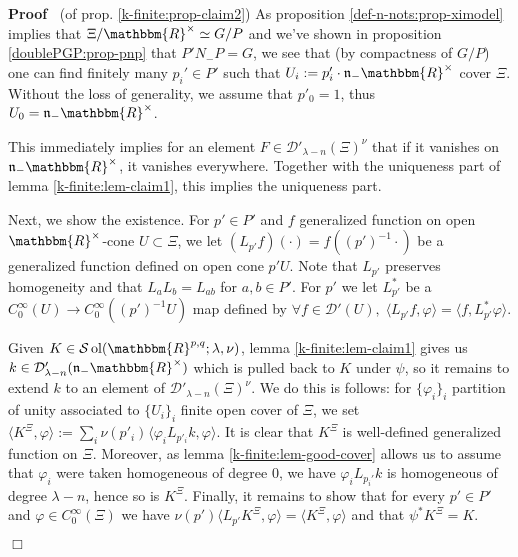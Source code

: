\documentclass{article}
\newcommand{\assign}{:=}
\newcommand{\tmop}[1]{\ensuremath{\operatorname{#1}}}
\newenvironment{proof}{\noindent\textbf{Proof\ }}{\hspace*{\fill}$\Box$\medskip}
\begin{document}
\begin{proof}
  (of prop. \ref{k-finite:prop-claim2}) As proposition
  \ref{def-n-nots:prop-ximodel} implies that $\Xi /\mathbbm{R}^{\times} \simeq
  G / P$ and we've shown in proposition \ref{doublePGP:prop-pnp} that $P' N_-
  P = G$, we see that (by compactness of $G / P$) one can find finitely many
  $p_i' \in P'$ such that $U_i \assign p_i' \cdot \mathfrak{n}_-
  \mathbbm{R}^{\times}$ cover $\Xi$. Without the loss of generality, we assume
  that $p'_0 = 1$, thus $U_0 =\mathfrak{n}_- \mathbbm{R}^{\times}$.
  
  This immediately implies for an element $F \in \mathcal{D}'_{\lambda - n}
  (\Xi)^{\nu}$ that if it vanishes on $\mathfrak{n}_- \mathbbm{R}^{\times}$,
  it vanishes everywhere. Together with the uniqueness part of lemma
  \ref{k-finite:lem-claim1}, this implies the uniqueness part.
  
  Next, we show the existence. For $p' \in P'$ and $f$ generalized function on
  open $\mathbbm{R}^{\times}$-cone $U \subset \Xi$, we let $(L_{p'} f) (\cdot)
  = f ((p')^{- 1} \cdot)$ be a generalized function defined on open cone $p'
  U$. Note that $L_{p'}$ preserves homogeneity and that $L_a L_b = L_{a b}$
  for $a, b \in P'$. For $p'$ we let $L_{p'}^{\ast}$ be a $C_0^{\infty} (U)
  \rightarrow C_0^{\infty} ((p')^{- 1} U)$ map defined by $\forall f \in
  \mathcal{D}' (U), \; \langle L_{p'} f, \varphi \rangle = \langle f,
  L_{p'}^{\ast} \varphi \rangle$.
  
  Given $K \in \mathcal{S} \tmop{ol} (\mathbbm{R}^{p, q} ; \lambda, \nu)$,
  lemma \ref{k-finite:lem-claim1} gives us $k \in \mathcal{D}'_{\lambda - n}
  (\mathfrak{n}_- \mathbbm{R}^{\times})$ which is pulled back to $K$ under
  $\psi$, so it remains to extend $k$ to an element of $\mathcal{D}'_{\lambda
  - n} (\Xi)^{\nu}$. We do this is follows: for $\{ \varphi_i \}_i$ partition
  of unity associated to $\{ U_i \}_i$ finite open cover of $\Xi$, we set
  $\langle K^{\Xi}, \varphi \rangle \assign \sum_i \nu (p'_i)^{} \langle
  \varphi_i L_{p'_i} k, \varphi \rangle$. It is clear that $K^{\Xi}$ is
  well-defined generalized function on $\Xi$. Moreover, as lemma
  \ref{k-finite:lem-good-cover} allows us to assume that $\varphi_i$ were
  taken homogeneous of degree 0, we have $\varphi_i L_{p_i'} k$ is homogeneous
  of degree $\lambda - n$, hence so is $K^{\Xi}$. Finally, it remains to show
  that for every $p' \in P'$ and $\varphi \in C^{\infty}_0 (\Xi)$ we have $\nu
  (p') \langle L_{p'} K^{\Xi}, \varphi \rangle = \langle K^{\Xi}, \varphi
  \rangle$ and that $\psi^{\ast} K^{\Xi} = K$.
  

\end{proof}
\end{document}
